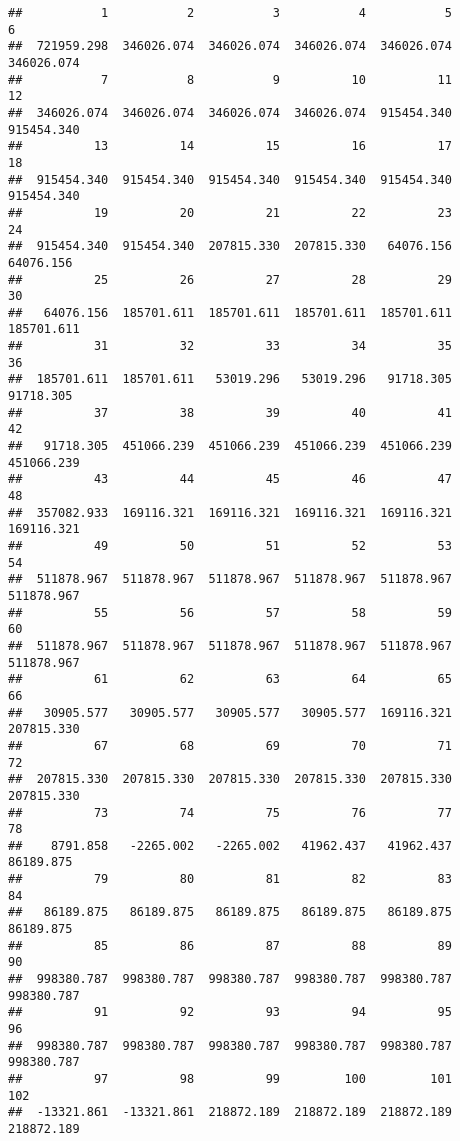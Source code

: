 \documentclass[
]{book}
\begin{document}
\begin{verbatim}
##           1           2           3           4           5           6 
##  721959.298  346026.074  346026.074  346026.074  346026.074  346026.074 
##           7           8           9          10          11          12 
##  346026.074  346026.074  346026.074  346026.074  915454.340  915454.340 
##          13          14          15          16          17          18 
##  915454.340  915454.340  915454.340  915454.340  915454.340  915454.340 
##          19          20          21          22          23          24 
##  915454.340  915454.340  207815.330  207815.330   64076.156   64076.156 
##          25          26          27          28          29          30 
##   64076.156  185701.611  185701.611  185701.611  185701.611  185701.611 
##          31          32          33          34          35          36 
##  185701.611  185701.611   53019.296   53019.296   91718.305   91718.305 
##          37          38          39          40          41          42 
##   91718.305  451066.239  451066.239  451066.239  451066.239  451066.239 
##          43          44          45          46          47          48 
##  357082.933  169116.321  169116.321  169116.321  169116.321  169116.321 
##          49          50          51          52          53          54 
##  511878.967  511878.967  511878.967  511878.967  511878.967  511878.967 
##          55          56          57          58          59          60 
##  511878.967  511878.967  511878.967  511878.967  511878.967  511878.967 
##          61          62          63          64          65          66 
##   30905.577   30905.577   30905.577   30905.577  169116.321  207815.330 
##          67          68          69          70          71          72 
##  207815.330  207815.330  207815.330  207815.330  207815.330  207815.330 
##          73          74          75          76          77          78 
##    8791.858   -2265.002   -2265.002   41962.437   41962.437   86189.875 
##          79          80          81          82          83          84 
##   86189.875   86189.875   86189.875   86189.875   86189.875   86189.875 
##          85          86          87          88          89          90 
##  998380.787  998380.787  998380.787  998380.787  998380.787  998380.787 
##          91          92          93          94          95          96 
##  998380.787  998380.787  998380.787  998380.787  998380.787  998380.787 
##          97          98          99         100         101         102 
##  -13321.861  -13321.861  218872.189  218872.189  218872.189  218872.189 

\end{verbatim}
\end{document}
